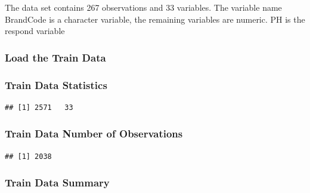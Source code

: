 \documentclass[]{article}
\begin{document}
The data set contains 267 observations and 33 variables. The variable
name BrandCode is a character variable, the remaining variables are
numeric. PH is the respond variable

\subsubsection{Load the Train Data}\label{load-the-train-data}

\subsubsection{Train Data Statistics}\label{train-data-statistics}

\begin{verbatim}
## [1] 2571   33
\end{verbatim}

\subsubsection{Train Data Number of
Observations}\label{train-data-number-of-observations}

\begin{verbatim}
## [1] 2038
\end{verbatim}

\subsubsection{Train Data Summary}\label{train-data-summary}
\end{document}
